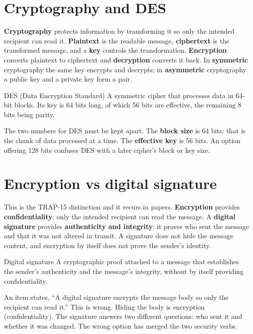 \section{Cryptography and DES}
\textbf{Cryptography} protects information by transforming it so only the
intended recipient can read it. \textbf{Plaintext} is the readable message,
\textbf{ciphertext} is the transformed message, and a \textbf{key} controls
the transformation. \textbf{Encryption} converts plaintext to ciphertext and
\textbf{decryption} converts it back. In \textbf{symmetric} cryptography the
same key encrypts and decrypts; in \textbf{asymmetric} cryptography a public
key and a private key form a pair.

\begin{definitionbox}{DES (Data Encryption Standard)}
A symmetric cipher that processes data in 64-bit blocks. Its key is 64 bits
long, of which 56 bits are effective, the remaining 8 bits being parity.
\end{definitionbox}

The two numbers for DES must be kept apart. The \textbf{block size} is 64
bits: that is the chunk of data processed at a time. The \textbf{effective
key} is 56 bits. An option offering 128 bits confuses DES with a later
cipher's block or key size.

\section{Encryption vs digital signature}
This is the TRAP-15 distinction and it recurs in papers. \textbf{Encryption}
provides \textbf{confidentiality}: only the intended recipient can read the
message. A \textbf{digital signature} provides \textbf{authenticity and
integrity}: it proves who sent the message and that it was not altered in
transit. A signature does not hide the message content, and encryption by
itself does not prove the sender's identity.

\begin{definitionbox}{Digital signature}
A cryptographic proof attached to a message that establishes the sender's
authenticity and the message's integrity, without by itself providing
confidentiality.
\end{definitionbox}

\begin{example}
An item states, ``A digital signature encrypts the message body so only the
recipient can read it.'' This is wrong. Hiding the body is encryption
(confidentiality). The signature answers two different questions: who sent it
and whether it was changed. The wrong option has merged the two security
verbs.
\end{example}

